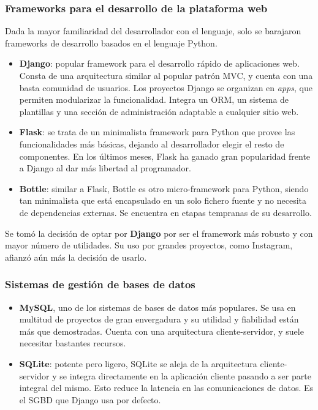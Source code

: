 \subsubsection{Frameworks para el desarrollo de la plataforma web}

Dada la mayor familiaridad del desarrollador con el lenguaje, solo se barajaron
frameworks de desarrollo basados en el lenguaje Python.

\begin{itemize}
\item \textbf{Django}: popular framework para el desarrollo rápido de
  aplicaciones web. Consta de una arquitectura similar al popular patrón
  \ac{MVC}, y cuenta con una basta comunidad de usuarios. Los proyectos Django
  se organizan en \textit{apps}, que permiten modularizar la
  funcionalidad. Integra un \ac{ORM}, un sistema de plantillas y una sección de
  administración adaptable a cualquier sitio web.

\item \textbf{Flask}: se trata de un minimalista framework para Python que
  provee las funcionalidades más básicas, dejando al desarrollador elegir el
  resto de componentes. En los últimos meses, Flask ha ganado gran popularidad
  frente a Django al dar más libertad al programador.

\item \textbf{Bottle}: similar a Flask, Bottle es otro micro-framework para
  Python, siendo tan minimalista que está encapsulado en un solo fichero fuente
  y no necesita de dependencias externas. Se encuentra en etapas tempranas de su desarrollo.

\end{itemize}

Se tomó la decisión de optar por \textbf{Django} por ser el framework más
robusto y con mayor número de utilidades. Su uso por grandes proyectos, como
Instagram, afianzó aún más la decisión de usarlo.

\subsubsection{Sistemas de gestión de bases de datos}

\begin{itemize}
\item \textbf{MySQL}, uno de los sistemas de bases de datos más populares. Se
  usa en multitud de proyectos de gran envergadura y su utilidad y fiabilidad
  están más que demostradas. Cuenta con una arquitectura cliente-servidor, y
  suele necesitar bastantes recursos.

\item \textbf{SQLite}: potente pero ligero, SQLite se aleja de la arquitectura
  cliente-servidor y se integra directamente en la aplicación cliente pasando a
  ser parte integral del mismo. Esto reduce la latencia en las comunicaciones de
  datos. Es el SGBD que Django usa por defecto.

\end{itemize}


